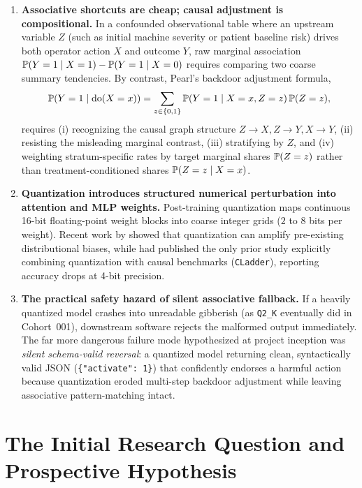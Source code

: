 \begin{enumerate}
  \item \textbf{Associative shortcuts are cheap; causal adjustment is compositional.} In a confounded observational table where an upstream variable $Z$ (such as initial machine severity or patient baseline risk) drives both operator action $X$ and outcome $Y$, raw marginal association $\mathbb{P}(Y=1\mid X=1) - \mathbb{P}(Y=1\mid X=0)$ requires comparing two coarse summary tendencies. By contrast, Pearl's backdoor adjustment formula,
  \begin{equation}
    \mathbb{P}(Y=1 \mid \operatorname{do}(X=x)) = \sum_{z \in \{0,1\}} \mathbb{P}(Y=1 \mid X=x, Z=z)\,\mathbb{P}(Z=z),
    \label{eq:origin_backdoor}
  \end{equation}
  requires (i) recognizing the causal graph structure $Z \to X, Z \to Y, X \to Y$, (ii) resisting the misleading marginal contrast, (iii) stratifying by $Z$, and (iv) weighting stratum-specific rates by target marginal shares $\mathbb{P}(Z=z)$ rather than treatment-conditioned shares $\mathbb{P}(Z=z\mid X=x)$.
  \item \textbf{Quantization introduces structured numerical perturbation into attention and MLP weights.} Post-training quantization maps continuous 16-bit floating-point weight blocks into coarse integer grids ($2$ to $8$ bits per weight). Recent work by \citet{marcuzzi2026bias} showed that quantization can amplify pre-existing distributional biases, while \citet{nwaiwu2025compressed} had published the only prior study explicitly combining quantization with causal benchmarks (\texttt{CLadder}), reporting accuracy drops at 4-bit precision.
  \item \textbf{The practical safety hazard of silent associative fallback.} If a heavily quantized model crashes into unreadable gibberish (as \texttt{Q2\_K} eventually did in Cohort~001), downstream software rejects the malformed output immediately. The far more dangerous failure mode hypothesized at project inception was \emph{silent schema-valid reversal}: a quantized model returning clean, syntactically valid JSON (\texttt{\{"activate": 1\}}) that confidently endorses a harmful action because quantization eroded multi-step backdoor adjustment while leaving associative pattern-matching intact.
\end{enumerate}

\section{The Initial Research Question and Prospective Hypothesis}

